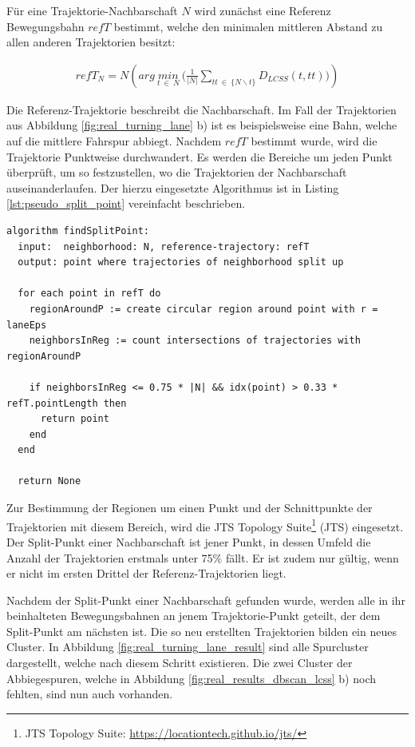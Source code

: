 Für eine Trajektorie-Nachbarschaft $N$ wird zunächst eine Referenz Bewegungsbahn $refT$ bestimmt, welche den
minimalen mittleren Abstand zu allen anderen Trajektorien besitzt:

\begin{ceqn}
\begin{align}
    refT_N = N(arg\ \underset{t\ \in\ N}{min}\ \Big(\frac{1}{|N|} \sum_{tt\ \in\ \{N \backslash t\}} D_{LCSS}(t, tt) \Big))
\end{align}
\end{ceqn}

Die Referenz-Trajektorie beschreibt die Nachbarschaft. Im Fall der Trajektorien aus Abbildung
\ref{fig:real_turning_lane} b) ist es beispielsweise eine Bahn, welche auf die mittlere Fahrspur abbiegt.
Nachdem $refT$ bestimmt wurde, wird die Trajektorie Punktweise durchwandert. Es werden die Bereiche um jeden
Punkt überprüft, um so festzustellen, wo die Trajektorien der Nachbarschaft auseinanderlaufen. Der hierzu
eingesetzte Algorithmus ist in Listing \ref{lst:pseudo_split_point} vereinfacht beschrieben.
\begin{lstlisting}[caption=Pseudocode Split-Punkt Bestimmung, language=Pseudo, label=lst:pseudo_split_point]
algorithm findSplitPoint:
  input:  neighborhood: N, reference-trajectory: refT
  output: point where trajectories of neighborhood split up

  for each point in refT do
    regionAroundP := create circular region around point with r = laneEps
    neighborsInReg := count intersections of trajectories with regionAroundP

    if neighborsInReg <= 0.75 * |N| && idx(point) > 0.33 * refT.pointLength then
      return point
    end
  end

  return None
\end{lstlisting}

Zur Bestimmung der Regionen um einen Punkt und der Schnittpunkte der Trajektorien mit diesem Bereich,
wird die JTS Topology Suite\footnote{JTS Topology Suite: \url{https://locationtech.github.io/jts/}}
(JTS) eingesetzt. Der Split-Punkt einer Nachbarschaft ist jener Punkt, in dessen Umfeld die Anzahl der
Trajektorien erstmals unter 75\% fällt. Er ist zudem nur gültig, wenn er nicht im ersten Drittel der
Referenz-Trajektorien liegt.

Nachdem der Split-Punkt einer Nachbarschaft gefunden wurde, werden alle in ihr beinhalteten Bewegungsbahnen
an jenem Trajektorie-Punkt geteilt, der dem Split-Punkt am nächsten ist.
Die so neu erstellten Trajektorien bilden ein neues Cluster. In Abbildung \ref{fig:real_turning_lane_result}
sind alle Spurcluster dargestellt, welche nach diesem Schritt existieren. Die zwei Cluster der Abbiegespuren,
welche in Abbildung \ref{fig:real_results_dbscan_lcss} b) noch fehlten, sind nun auch vorhanden.

